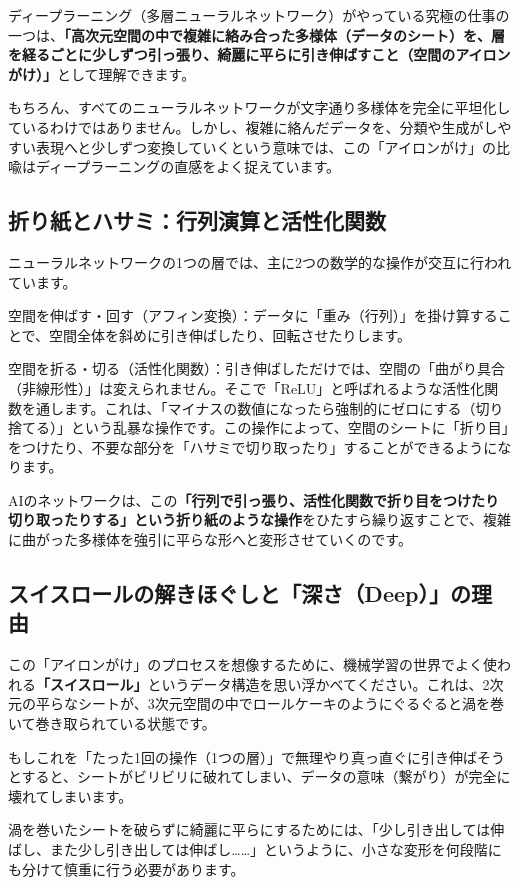 ディープラーニング（多層ニューラルネットワーク）がやっている究極の仕事の一つは、\textbf{「高次元空間の中で複雑に絡み合った多様体（データのシート）を、層を経るごとに少しずつ引っ張り、綺麗に平らに引き伸ばすこと（空間のアイロンがけ）」}として理解できます。

もちろん、すべてのニューラルネットワークが文字通り多様体を完全に平坦化しているわけではありません。しかし、複雑に絡んだデータを、分類や生成がしやすい表現へと少しずつ変換していくという意味では、この「アイロンがけ」の比喩はディープラーニングの直感をよく捉えています。

\subsection{折り紙とハサミ：行列演算と活性化関数}

ニューラルネットワークの1つの層では、主に2つの数学的な操作が交互に行われています。

空間を伸ばす・回す（アフィン変換）：データに「重み（行列）」を掛け算することで、空間全体を斜めに引き伸ばしたり、回転させたりします。

空間を折る・切る（活性化関数）：引き伸ばしただけでは、空間の「曲がり具合（非線形性）」は変えられません。そこで「ReLU」と呼ばれるような活性化関数を通します。これは、「マイナスの数値になったら強制的にゼロにする（切り捨てる）」という乱暴な操作です。この操作によって、空間のシートに「折り目」をつけたり、不要な部分を「ハサミで切り取ったり」することができるようになります。

AIのネットワークは、この\textbf{「行列で引っ張り、活性化関数で折り目をつけたり切り取ったりする」という折り紙のような操作}をひたすら繰り返すことで、複雑に曲がった多様体を強引に平らな形へと変形させていくのです。

\subsection{スイスロールの解きほぐしと「深さ（Deep）」の理由}

この「アイロンがけ」のプロセスを想像するために、機械学習の世界でよく使われる\textbf{「スイスロール」}というデータ構造を思い浮かべてください。これは、2次元の平らなシートが、3次元空間の中でロールケーキのようにぐるぐると渦を巻いて巻き取られている状態です。

もしこれを「たった1回の操作（1つの層）」で無理やり真っ直ぐに引き伸ばそうとすると、シートがビリビリに破れてしまい、データの意味（繋がり）が完全に壊れてしまいます。

渦を巻いたシートを破らずに綺麗に平らにするためには、「少し引き出しては伸ばし、また少し引き出しては伸ばし\ldots{}\ldots{}」というように、小さな変形を何段階にも分けて慎重に行う必要があります。

